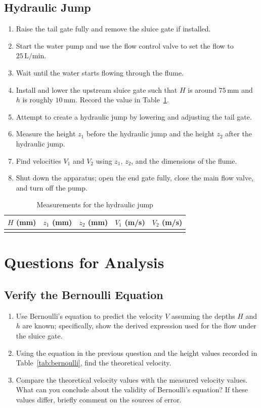 \documentclass[12pt,letterpaper]{article}
\begin{document}
\subsection{Hydraulic Jump}
\begin{enumerate}[leftmargin=*]
    \item Raise the tail gate fully and remove the sluice gate if installed.
    \item Start the water pump and use the flow control valve to set the flow to \(25\,\text{L/min}\).
    \item Wait until the water starts flowing through the flume.
    \item Install and lower the upstream sluice gate such that \(H\) is around \(75\,\text{mm}\) and \(h\) is roughly \(10\,\text{mm}\). Record the value in Table~\ref{tab:jump}.
    \item Attempt to create a hydraulic jump by lowering and adjusting the tail gate.
    \item Measure the height \(z_1\) before the hydraulic jump and the height \(z_2\) after the hydraulic jump.
    \item Find velocities \(V_1\) and \(V_2\) using \(z_1\), \(z_2\), and the dimensions of the flume.
    \item Shut down the apparatus; open the end gate fully, close the main flow valve, and turn off the pump.
\end{enumerate}

\begin{table}[H]
\centering
\caption{Measurements for the hydraulic jump}
\label{tab:jump}
\begin{tabular}{ccccc}
\toprule
\(H\) (mm) & \(z_1\) (mm) & \(z_2\) (mm) & \(V_1\) (m/s) & \(V_2\) (m/s) \\
\midrule
 & & & & \\
\bottomrule
\end{tabular}
\end{table}

\section{Questions for Analysis}

\subsection{Verify the Bernoulli Equation}
\begin{enumerate}[leftmargin=*]
    \item Use Bernoulli’s equation to predict the velocity \(V\) assuming the depths \(H\) and \(h\) are known; specifically, show the derived expression used for the flow under the sluice gate.
    \item Using the equation in the previous question and the height values recorded in Table~\ref{tab:bernoulli}, find the theoretical velocity.
    \item Compare the theoretical velocity values with the measured velocity values. What can you conclude about the validity of Bernoulli’s equation? If these values differ, briefly comment on the sources of error.
\end{enumerate}
\end{document}
